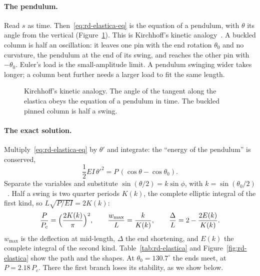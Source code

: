 \paragraph{The pendulum.}
%
Read $s$ as time. Then~\eqref{eq:rd-elastica-eq} is the equation of a pendulum, with $\theta$
its angle from the vertical (Figure~\ref{fig:rd-pendulum}). This is Kirchhoff's kinetic
analogy~\cite[Section~3.8]{rd-audoly2010}. A buckled column is half an oscillation: it leaves
one pin with the end rotation $\theta_0$ and no curvature, the pendulum at the end of its swing,
and reaches the other pin with $-\theta_0$. Euler's load is the small-amplitude limit. A
pendulum swinging wider takes longer; a column bent further needs a larger load to fit the
same length.

\begin{figure}[ht]
  \centering
  
  \caption{Kirchhoff's kinetic analogy. The angle of the tangent along the elastica obeys the
    equation of a pendulum in time. The buckled pinned column is half a swing.}
  \label{fig:rd-pendulum}
\end{figure}

\paragraph{The exact solution.}
Multiply~\eqref{eq:rd-elastica-eq} by $\theta'$ and integrate: the ``energy of the pendulum'' is
conserved,
\begin{equation}\label{eq:rd-first-integral}
  \frac12 EI\,\theta'^2 = P\,(\cos\theta - \cos\theta_0) .
\end{equation}
Separate the variables and substitute $\sin(\theta/2) = k\sin\phi$, with
$k = \sin(\theta_0/2)$~\cite[pp.~85--89]{rd-triantafyllidis2011}. Half a swing is two quarter periods
$K(k)$, the complete elliptic integral of the first kind, so $L\sqrt{P/EI} = 2K(k)$:
\begin{equation}\label{eq:rd-elastica-exact}
  \frac{P}{P_c} = \Bigl(\frac{2K(k)}{\pi}\Bigr)^2,
  \qquad
  \frac{w_{\max}}{L} = \frac{k}{K(k)},
  \qquad
  \frac{\Delta}{L} = 2 - \frac{2E(k)}{K(k)} .
\end{equation}
$w_{\max}$ is the deflection at mid-length, $\Delta$ the end shortening, and $E(k)$ the
complete integral of the second kind. Table~\ref{tab:rd-elastica} and
Figure~\ref{fig:rd-elastica} show the path and the shapes. At $\theta_0 = 130.7^\circ$ the ends
meet, at $P = 2.18\,P_c$. There the first branch loses its stability, as we show below.

